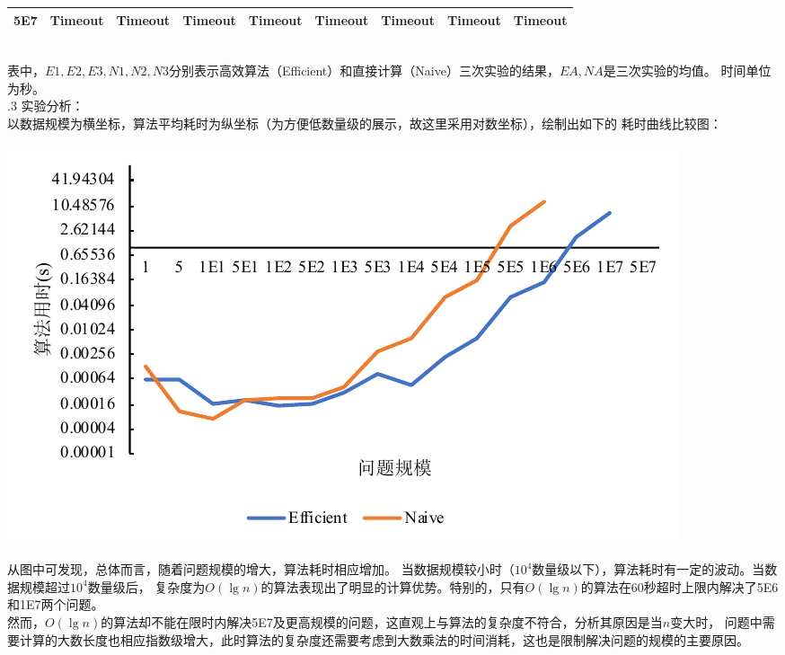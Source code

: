 \documentclass[a4paper]{article}
\begin{document}
\begin{enumerate}
{\begin{tabular}{c||ccc|c||ccc|c}
    5E7&Timeout&Timeout&Timeout&Timeout&Timeout&Timeout&Timeout&Timeout\\
    \hline\hline
  \end{tabular}
  }\\
  \medskip
  表中，$E1,E2,E3,N1,N2,N3$分别表示高效算法（Efficient）和直接计算（Naive）三次实验的结果，$EA,NA$是三次实验的均值。
  时间单位为秒。\\
  .3 实验分析：\\
  以数据规模为横坐标，算法平均耗时为纵坐标（为方便低数量级的展示，故这里采用对数坐标），绘制出如下的
  耗时曲线比较图：
  \begin{center}
    \includegraphics[scale=0.8]{Pictures/Chart.pdf}
  \end{center}
  从图中可发现，总体而言，随着问题规模的增大，算法耗时相应增加。
  当数据规模较小时（$10^4$数量级以下），算法耗时有一定的波动。当数据规模超过$10^4$数量级后，
  复杂度为$O(\lg n)$的算法表现出了明显的计算优势。特别的，只有$O(\lg n)$的算法在60秒超时上限内解决了5E6和1E7两个问题。\\
  然而，$O(\lg n)$的算法却不能在限时内解决5E7及更高规模的问题，这直观上与算法的复杂度不符合，分析其原因是当$n$变大时，
  问题中需要计算的大数长度也相应指数级增大，此时算法的复杂度还需要考虑到大数乘法的时间消耗，这也是限制解决问题的规模的主要原因。\\
\end{enumerate}
\end{document}
